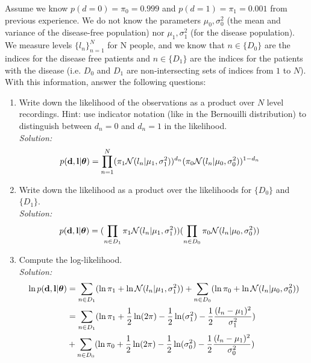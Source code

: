 \documentclass[12pt,a4paper]{article}
\newcommand{\thetavec}{\boldsymbol{\theta}}
\newcommand{\dvec}{{\bf d}}
\newcommand{\lvec}{{\bf l}}
\begin{document}
Assume we know $p(d=0) = \pi_0 = 0.999$ and $p(d=1) = \pi_1 = 0.001$ from previous experience.  We do not know the parameters $\mu_0, \sigma_0^2$ (the mean and variance of the disease-free population) nor $\mu_1, \sigma_1^2$ (for the disease population).  We measure levels $\{ l_n\}_{n=1}^N$ for N people, and we know that $n\in\{D_0\}$ are the indices for the disease free patients and $n\in\{D_1\}$ are the indices for the patients with the disease (i.e. $D_0$ and $D_1$ are non-intersecting sets of indices from $1$ to $N$).  With this information, answer the following questions:

\begin{enumerate}
  \item Write down the likelihood of the observations as a product over $N$ level recordings.  Hint: use indicator notation (like in the Bernouilli distribution) to distinguish between $d_n=0$ and $d_n=1$ in the likelihood. \\
  \emph{Solution:} \\
	  \begin{align*}
	  	p(\dvec, \lvec | \thetavec) &= \prod_{n = 1}^{N} (\pi_1 \mathcal{N} (l_{n} | \mu_{1}, \sigma_{1}^{2}) )^{d_n} (\pi_0 \mathcal{N} (l_{n} | \mu_{0}, \sigma_{0}^{2})) ^{1 - d_n} 
	  \end{align*}
  
  \item Write down the likelihood as a product over the likelihoods for $\{D_0\}$ and $\{D_1\}$. \\
	  \emph{Solution:} \\
		  \begin{align*}
		  	p(\dvec, \lvec | \thetavec) 
		  	&= ( \prod_{n \in D_1} \pi_{1} \mathcal{N}(l_n | \mu_{1} , \sigma_{1}^{2})) ( \prod_{n \in D_0} \pi_{0} \mathcal{N}(l_n | \mu_{0} , \sigma_{0}^{2}))
		  \end{align*}
  
  \item Compute the log-likelihood. \\
	  \emph{Solution:} \\
		  \begin{align*}
		  	\ln p(\dvec, \lvec | \thetavec) &= \sum_{n \in D_{1}}(\ln \pi_{1} + \ln \mathcal{N}(l_{n} | \mu_{1}, \sigma_{1}^{2}) ) + \sum_{n \in D_{0}} (\ln \pi_{0} + \ln \mathcal{N}(l_{n} | \mu_{0}, \sigma_{0}^{2})) \\
		  	&= \sum_{n \in D_{1}}(\ln \pi_{1} + \frac{1}{2} \ln (2 \pi) - \frac{1}{2} \ln (\sigma_{1}^{2}) - \frac{1}{2} \frac{(l_{n} - \mu_{1})^{2}}{\sigma_{1}^{2}}) \\
		  	&+ \sum_{n \in D_{0}}  (\ln \pi_{0} + \frac{1}{2} \ln (2 \pi) - \frac{1}{2} \ln (\sigma_{0}^{2}) - \frac{1}{2} \frac{(l_{n} - \mu_{1})^{2}}{\sigma_{0}^{2}})
		  \end{align*}
  

\end{enumerate}
\end{document}
